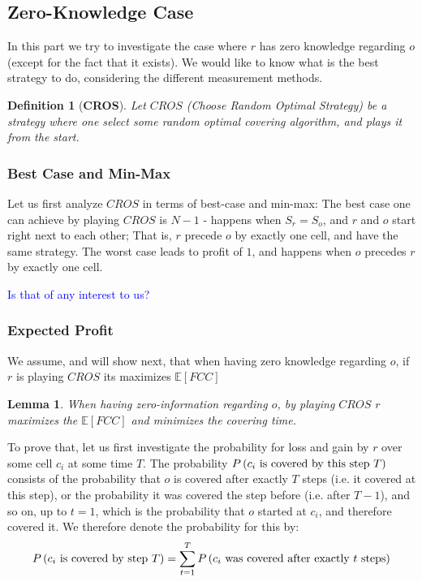 \documentclass[a4paper,10pt]{article}
\newtheorem{lemma}[theorem]{Lemma}
\newcommand\rob{\ensuremath{r}\xspace}
\newcommand\opp{\ensuremath{o}\xspace}
\newcommand{\fcc}{\ensuremath{FCC}\xspace}
\newcommand{\cros}{\ensuremath{CROS}\xspace}
\newtheorem{definition}{Definition}
\begin{document}
\subsection{Zero-Knowledge Case}\label{subsubsections:ZeroKnowledge}
In this part we try to investigate the case where \rob has zero knowledge regarding \opp (except for the fact that it exists). We would like to know what is the best strategy to do, considering the different measurement methods.

\begin{definition}[\textbf{CROS}]
Let \textbf{\cros} (Choose Random Optimal Strategy) be a strategy where one select some random optimal covering algorithm, and plays it from the start. 
\end{definition}

\subsubsection{Best Case and Min-Max}
Let us first analyze \cros in terms of best-case and min-max:
The best case one can achieve by playing \cros is $N-1$ - happens when $S_{\rob} = S_{\opp}$, and \rob and \opp start right next to each other; That is, \rob precede \opp by exactly one cell, and have the same strategy.
The worst case leads to profit of $1$, and happens when \opp precedes \rob by exactly one cell.

\textcolor{blue}{Is that of any interest to us?}

\subsubsection{Expected Profit}
We assume, and will show next, that when having zero knowledge regarding \opp, if \rob is playing \cros its maximizes $\mathbb{E}[\fcc]$

\begin{lemma}\label{lem:NoInformationEFCC}
When having zero-information regarding \opp, by playing \textbf{\cros} \rob maximizes the $\mathbb{E}\left[\fcc\right]$ and minimizes the covering time.
\end{lemma}

To prove that, let us first investigate the probability for loss and gain by \rob over some cell $c_i$ at some time $T$.
The probability $P\left(\textnormal{$c_i$ is covered by this step $T$}\right)$ consists of the probability that \opp is covered after exactly $T$ steps (i.e. it covered at this step), or the probability it was covered the step before (i.e. after $T-1$), and so on, up to $t=1$, which is the probability that \opp started at $c_i$, and therefore covered it.
We therefore denote the probability for this by:
\[P\left(\textnormal{$c_i$ is covered by step $T$}\right)=\sum_{t=1}^{T}{P\left(\textnormal{$c_i$ was covered after exactly $t$ steps}\right)}\]
\end{document}
